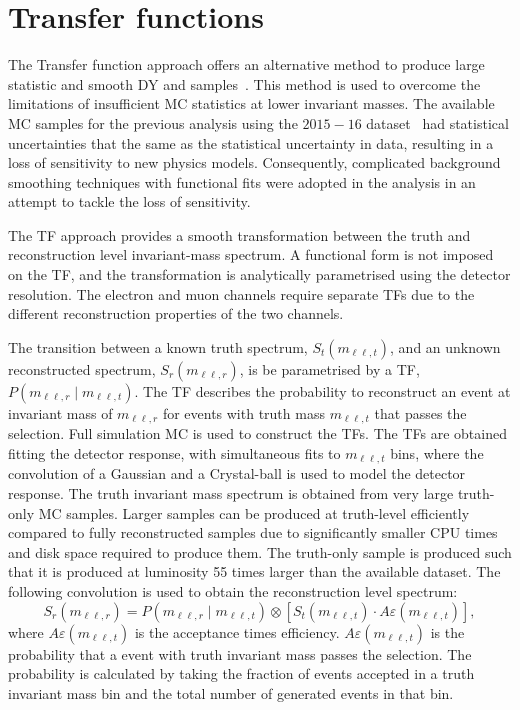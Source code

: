 \section{Transfer functions}\label{sec:datamc:transfer}
The Transfer function approach offers an alternative method to produce large statistic and smooth DY and \ttbar samples~\cite{Aad:2019fac,Falke:2693468}. This method is used to overcome the limitations of insufficient MC statistics at lower invariant masses. The available MC samples for the previous analysis using the $2015-16$ dataset~\cite{EXOT-2016-05} had statistical uncertainties that the same as the statistical uncertainty in data, resulting in a loss of sensitivity to new physics models. Consequently, complicated background smoothing techniques with functional fits were adopted in the analysis in an attempt to tackle the loss of sensitivity.

The TF approach provides a smooth transformation between the truth and reconstruction level invariant-mass spectrum. A functional form is not imposed on the TF, and the transformation is analytically parametrised using the detector resolution. The electron and muon channels require separate TFs due to the different reconstruction properties of the two channels.

The transition between a known truth spectrum, $S_t(m_{\ell\ell,t})$, and an unknown reconstructed spectrum, $S_r(m_{\ell\ell,r})$, is be parametrised by a TF, $P(m_{\ell\ell,r} \mid m_{\ell\ell,t})$. The TF describes the probability to reconstruct an event at invariant mass of $m_{\ell\ell,r}$ for events with truth mass $m_{\ell\ell,t}$ that passes the selection. Full simulation MC is used to construct the TFs. The TFs are obtained fitting the detector response, with simultaneous fits to $m_{\ell\ell,t}$ bins, where the convolution of a Gaussian and a Crystal-ball is used to model the detector response. The truth invariant mass spectrum is obtained from very large truth-only MC samples. Larger samples can be produced at truth-level efficiently compared to fully reconstructed samples due to significantly smaller CPU times and disk space required to produce them. The truth-only sample is produced such that it is produced at luminosity 55 times larger than the available dataset. The following convolution is used to obtain the reconstruction level spectrum: 
\begin{equation}\label{eq:TF_generalConv}
	S_r(m_{\ell\ell,r}) = P(m_{\ell\ell,r} \mid m_{\ell\ell,t}) \otimes \left[ S_t(m_{\ell\ell,t}) \cdot A\varepsilon(m_{\ell\ell,t}) \right], 
\end{equation}
where $A\varepsilon(m_{\ell\ell,t})$ is the acceptance times efficiency. $A\varepsilon(m_{\ell\ell,t})$ is the probability that a event with truth invariant mass passes the selection. The probability is calculated by taking the fraction of events accepted in a truth invariant mass bin and the total number of generated events in that bin. 


